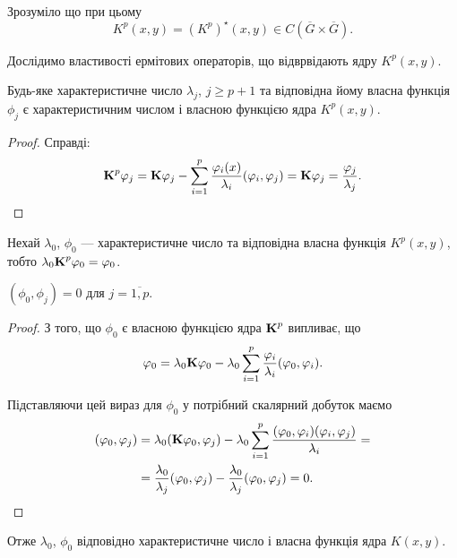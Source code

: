 Зрозуміло що при цьому
\begin{equation}
	K^p(x, y) = (K^p)^\star (x, y) \in  C\left(\overline G \times \overline G\right).
\end{equation}

Дослідимо властивості  ермітових операторів, що відврвідають ядру $K^p(x, y)$.

\begin{proposition}
	Будь-яке характеристичне число $\lambda_j$, $j\ge p + 1$ та відповідна йому власна функція $\phi_j$ є характеристичним числом і власною функцією ядра $K^p(x,y)$.
\end{proposition}

\begin{proof}
	Справді:
	\begin{equation}
		\bf{K}^p \phi_j = \bf{K} \phi_j - \Sum_{i = 1}^p \dfrac{\phi_i(x)}{\lambda_i} (\phi_i, \phi_j) = \bf{K} \phi_j = \dfrac{\phi_j}{\lambda_j}.
	\end{equation}
\end{proof}

Нехай $\lambda_0$, $\phi_0$ --- характеристичне число та відповідна власна функція $K^p(x, y)$, тобто $\lambda_0 \bf{K}^p \phi_0 = \phi_0$.

\begin{proposition}
	$(\phi_0, \phi_j) = 0$ для $j = \overline{1, p}$.
\end{proposition}

\begin{proof}
	З того, що $\phi_0$ є власною функцією ядра $\bf{K}^p$ випливає, що
	\begin{equation}
		\phi_0 = \lambda_0 \bf{K} \phi_0 - \lambda_0 \Sum_{i = 1}^p \dfrac{\phi_i}{\lambda_i} (\phi_0, \phi_i).
	\end{equation}

	Підставляючи цей вираз для $\phi_0$ у потрібний скалярний добуток маємо
	\begin{equation}
		\begin{aligned}
			(\phi_0, \phi_j) &= \lambda_0 (\bf{K} \phi_0, \phi_j) - \lambda_0 \Sum_{i = 1}^p \dfrac{(\phi_0, \phi_i)(\phi_i, \phi_j)}{\lambda_i} = \\
			&= \dfrac{\lambda_0}{\lambda_j} (\phi_0, \phi_j) - \dfrac{\lambda_0}{\lambda_j} (\phi_0, \phi_j) = 0. 
		\end{aligned}
	\end{equation}
\end{proof}

Отже $\lambda_0$, $\phi_0$ відповідно характеристичне число і власна функція ядра $K(x, y)$. \medskip

